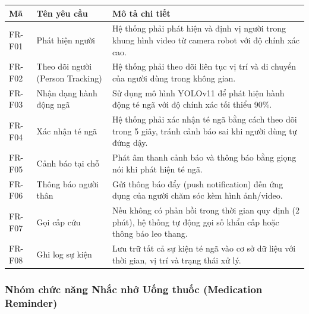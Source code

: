 \begin{table}[h!]
\centering
\label{tab:req-fall}
\begin{tabular}{|L{1.5cm}|L{3.5cm}|L{8.5cm}|}
\hline
\textbf{Mã} & \textbf{Tên yêu cầu} & \textbf{Mô tả chi tiết} \\
\hline
FR-F01 & Phát hiện người & Hệ thống phải phát hiện và định vị người trong khung hình video từ camera robot với độ chính xác cao. \\
\hline
FR-F02 & Theo dõi người (Person Tracking) & Hệ thống phải theo dõi liên tục vị trí và di chuyển của người dùng trong không gian. \\
\hline
FR-F03 & Nhận dạng hành động ngã & Sử dụng mô hình YOLOv11 để phát hiện hành động té ngã với độ chính xác tối thiểu 90\%. \\
\hline
FR-F04 & Xác nhận té ngã & Hệ thống phải xác nhận té ngã bằng cách theo dõi trong 5 giây, tránh cảnh báo sai khi người dùng tự đứng dậy. \\
\hline
FR-F05 & Cảnh báo tại chỗ & Phát âm thanh cảnh báo và thông báo bằng giọng nói khi phát hiện té ngã. \\
\hline
FR-F06 & Thông báo người thân & Gửi thông báo đẩy (push notification) đến ứng dụng của người chăm sóc kèm hình ảnh/video. \\
\hline
FR-F07 & Gọi cấp cứu & Nếu không có phản hồi trong thời gian quy định (2 phút), hệ thống tự động gọi số khẩn cấp hoặc thông báo leo thang. \\
\hline
FR-F08 & Ghi log sự kiện & Lưu trữ tất cả sự kiện té ngã vào cơ sở dữ liệu với thời gian, vị trí và trạng thái xử lý. \\
\hline
\end{tabular}
\end{table}

\newpage
\subsubsection{Nhóm chức năng Nhắc nhở Uống thuốc (Medication Reminder)}

